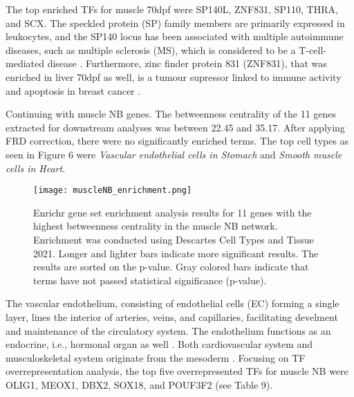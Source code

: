 \documentclass[
	a4paper, %
	10pt, %
	unnumberedsections, %
	twoside, %
]{LTJournalArticle}
\begin{document}
\noindent The top enriched TFs for muscle 70dpf were SP140L, ZNF831, SP110,
THRA, and SCX. The speckled protein (SP) family members are primarily 
expressed in leukocytes, and the 
SP140 locus has been associated with multiple autoimmune diseases, such
as multiple sclerosis (MS), which is considered to be 
a T-cell-mediated disease \autocite{karaky2018a}. Furthermore, zinc finder protein 831 (ZNF831), 
that was enriched in liver 70dpf as well, is a tumour supressor
linked to immune activity and apoptosis in breast cancer \autocite{fan2022a}.

Continuing with muscle NB genes. The betweenness centrality of
the 11 genes extracted for downstream analyses was between 22.45 and 35.17.
After applying FRD correction, there were no significantly enriched terms.
The top cell types as seen in Figure 6
were \textit{Vascular endothelial cells in Stomach} and 
\textit{Smooth muscle cells in Heart}.

\begin{figure}[H] %
	\texttt{[image: muscleNB\_enrichment.png]}
	\caption{Enrichr gene set enrichment analysis results for 11 genes
	with the highest betweenness centrality in the muscle NB network. Enrichment 
	was conducted using Descartes Cell Types and Tissue 2021. Longer and lighter
	bars indicate more significant results. The results are sorted on
	the p-value. Gray colored bars indicate that terms have 
	not passed statistical significance (p-value).}
	\label{fig:muscleNBenr}
\end{figure}

\noindent The vascular endothelium, consisting of endothelial cells (EC) forming a single layer,
lines the interior of arteries, veins, and capillaries, facilitating develment and maintenance
of the circulatory system. The endothelium functions as an endocrine, i.e., hormonal 
organ as well \autocite{kruegergenge2019a, trimm2023a}. Both cardiovascular system and musculoskeletal system
originate from the mesoderm \autocite{ferretti2019a}. Focusing on TF overrepresentation analysis,
the top five overrepresented TFs for muscle NB were OLIG1, MEOX1, DBX2, SOX18, and POUF3F2 (see Table 9).
\end{document}

